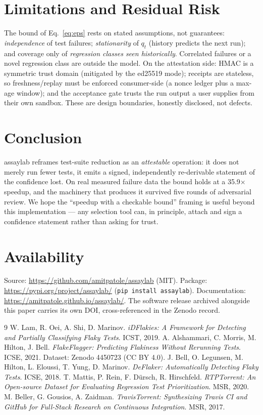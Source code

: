 \documentclass[11pt]{article}
\newcommand{\code}[1]{\texttt{#1}}
\begin{document}
\section{Limitations and Residual Risk}
\label{sec:limits}

The bound of Eq.~\eqref{eq:eps} rests on stated assumptions, not guarantees:
\emph{independence} of test failures; \emph{stationarity} of $q_t$ (history
predicts the next run); and coverage only of \emph{regression classes seen
historically}. Correlated failures or a novel regression class are outside the
model. On the attestation side: HMAC is a symmetric trust domain (mitigated by
the ed25519 mode); receipts are stateless, so freshness/replay must be enforced
consumer-side (a nonce ledger plus a max-age window); and the acceptance gate
trusts the run output a user supplies from their own sandbox. These are design
boundaries, honestly disclosed, not defects.

\section{Conclusion}

assaylab reframes test-suite reduction as an \emph{attestable} operation: it does
not merely run fewer tests, it emits a signed, independently re-derivable
statement of the confidence lost. On real measured failure data the bound holds
at a 35.9$\times$ speedup, and the machinery that produces it survived five
rounds of adversarial review. We hope the ``speedup with a checkable bound''
framing is useful beyond this implementation --- any selection tool can, in
principle, attach and sign a confidence statement rather than asking for trust.

\section*{Availability}

Source: \url{https://github.com/amitpatole/assaylab} (MIT). Package:
\url{https://pypi.org/project/assaylab/} (\code{pip install assaylab}).
Documentation: \url{https://amitpatole.github.io/assaylab/}. The software release
archived alongside this paper carries its own DOI, cross-referenced in the Zenodo
record.

\begin{thebibliography}{9}
 W. Lam, R. Oei, A. Shi, D. Marinov.
  \emph{iDFlakies: A Framework for Detecting and Partially Classifying Flaky
  Tests}. ICST, 2019.
 A. Alshammari, C. Morris, M. Hilton, J. Bell.
  \emph{FlakeFlagger: Predicting Flakiness Without Rerunning Tests}. ICSE, 2021.
  Dataset: Zenodo 4450723 (CC BY 4.0).
 J. Bell, O. Legunsen, M. Hilton, L. Eloussi, T. Yung,
  D. Marinov. \emph{DeFlaker: Automatically Detecting Flaky Tests}. ICSE, 2018.
 T. Mattis, P. Rein, F. D\"ursch, R. Hirschfeld.
  \emph{RTPTorrent: An Open-source Dataset for Evaluating Regression Test
  Prioritization}. MSR, 2020.
 M. Beller, G. Gousios, A. Zaidman.
  \emph{TravisTorrent: Synthesizing Travis CI and GitHub for Full-Stack Research
  on Continuous Integration}. MSR, 2017.
\end{thebibliography}
\end{document}
